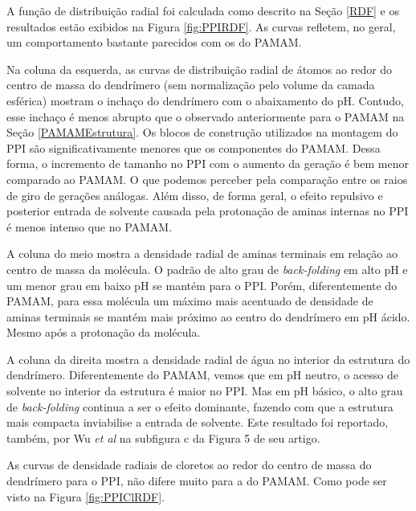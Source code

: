 A função de distribuição radial foi calculada como descrito na Seção \ref{RDF} e os resultados estão exibidos na Figura \ref{fig:PPIRDF}.
As curvas refletem, no geral, um comportamento bastante parecidos com os do PAMAM.

Na coluna da esquerda, as curvas de distribuição radial de átomos ao redor do centro de massa do dendrímero (sem normalização pelo volume da camada esférica) mostram o inchaço do dendrímero com o abaixamento do pH.
Contudo, esse inchaço é menos abrupto que o observado anteriormente para o PAMAM na Seção \ref{PAMAMEstrutura}.
Os blocos de construção utilizados na montagem do PPI são significativamente menores que os componentes do PAMAM. 
Dessa forma, o incremento de tamanho no PPI com o aumento da geração é bem menor comparado ao PAMAM.
O que podemos perceber pela comparação entre os raios de giro de gerações análogas.
Além disso, de forma geral, o efeito repulsivo e posterior entrada de solvente causada pela protonação de aminas internas no PPI é menos intenso que no PAMAM.

A coluna do meio mostra a densidade radial de aminas terminais em relação ao centro de massa da molécula.
O padrão de alto grau de \textit{back-folding} em alto pH e um menor grau em baixo pH se mantém para o PPI.
Porém, diferentemente do PAMAM, para essa molécula um máximo mais acentuado de densidade de aminas terminais se mantém mais próximo ao centro do dendrímero em pH ácido.
Mesmo após a protonação da molécula.

A coluna da direita mostra a densidade radial de água no interior da estrutura do dendrímero.
Diferentemente do PAMAM, vemos que em pH neutro, o acesso de solvente no interior da estrutura é maior no PPI.
Mas em pH básico, o alto grau de \textit{back-folding} continua a ser o efeito dominante, fazendo com que a estrutura mais compacta inviabilise a entrada de solvente.
Este resultado foi reportado, também, por Wu \textit{et al}\cite{Wu2010} na subfigura c da Figura 5 de seu artigo.

As curvas de densidade radiais de cloretos ao redor do centro de massa do dendrímero para o PPI, não difere muito para a do PAMAM. Como pode ser visto na Figura \ref{fig:PPIClRDF}.

